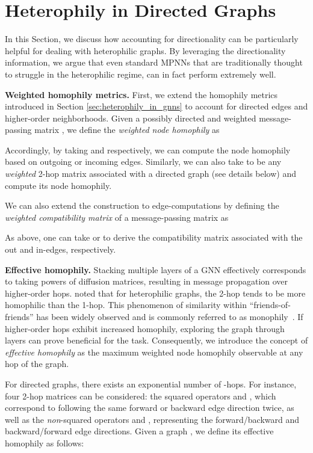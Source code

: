 \documentclass{article}
\theoremstyle{plain}
\theoremstyle{definition}
\theoremstyle{remark}
\begin{document}
 \section{Heterophily in Directed Graphs}
\label{sec:directed_heterophily}

In this Section, we discuss how accounting for directionality can be particularly helpful for dealing with heterophilic graphs. By leveraging the directionality information, we argue that even standard MPNNs that are traditionally thought to struggle in the heterophilic regime, can in fact perform extremely well. 

\textbf{Weighted homophily metrics.} First, we extend the homophily metrics introduced in Section \ref{sec:heterophily_in_gnns} to account for  directed edges and higher-order neighborhoods. 
Given a possibly directed and weighted  message-passing matrix , we define the \textit{weighted node homophily} as

\noindent Accordingly, by taking  and  respectively, we can compute the node homophily based on outgoing or incoming edges. Similarly, we can also take  to be any {\em weighted} 2-hop matrix associated with a directed graph (see details below) and compute its node homophily. 

We can also extend the construction to edge-computations by defining the  \textit{weighted compatibility matrix}  of a message-passing matrix  as 

\noindent As above, one can take  or  to derive the compatibility matrix associated with the out and in-edges, respectively.

\textbf{Effective homophily.} Stacking multiple layers of a GNN effectively corresponds to taking powers of diffusion matrices, resulting in message propagation over higher-order hops. \citet{zhu2020beyond} noted that for heterophilic graphs, the 2-hop tends to be more homophilic than the 1-hop. This phenomenon of similarity within ``friends-of-friends'' has been widely observed and is commonly referred to as monophily~\cite{monophily}. If higher-order hops exhibit increased homophily, exploring the graph through layers can prove beneficial for the task. Consequently, we introduce the concept of \textit{effective homophily} as the maximum weighted node homophily observable at any hop of the graph.

For directed graphs, there exists an exponential number of -hops. For instance, four 2-hop matrices can be considered: the squared operators  and , which correspond to following the same forward or backward edge direction twice, as well as the {\em non}-squared operators  and , representing the forward/backward and backward/forward edge directions. Given a graph , we define its effective homophily as follows:
\end{document}

